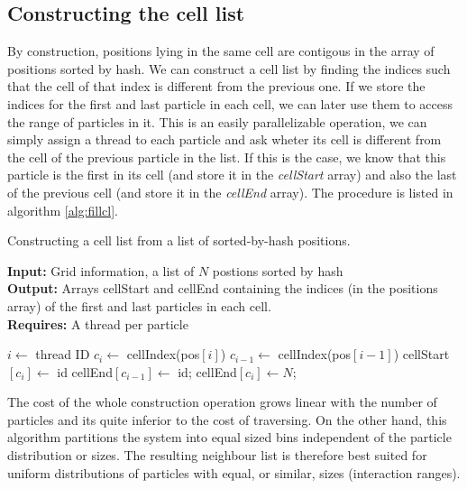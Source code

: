 \documentclass[ twoside,openright,titlepage,numbers=noenddot,%
headinclude,footinclude,cleardoublepage=empty,abstract=on,
BCOR=5mm,paper=a4,fontsize=11pt, dvipsnames
]{scrreprt}
\begin{document}
\subsection*{Constructing the cell list}
By construction, positions lying in the same cell are contigous in the array of positions sorted by hash. We can construct a cell list by finding the indices such that the cell of that index is different from the previous one. If we store the indices for the first and last particle in each cell, we can later use them to access the range of particles in it.
This is an easily parallelizable operation, we can simply assign a thread to each particle and ask wheter its cell is different from the cell of the previous particle in the list. If this is the case, we know that this particle is the first in its cell (and store it in the \emph{cellStart} array) and also the last of the previous cell (and store it in the \emph{cellEnd} array). The procedure is listed in algorithm \ref{alg:fillcl}.
\begin{algorithm}
  \caption{Constructing a cell list from a list of sorted-by-hash positions.} \label{alg:fillcl}
  \textbf{Input:} Grid information, a list of $N$ postions sorted by hash\\
  \textbf{Output:} Arrays cellStart and cellEnd containing the indices (in the positions array) of the first and last particles in each cell.\\
  \textbf{Requires:} A thread per particle
  \begin{algorithmic}[1]
    \State $i\gets$ thread ID 
    \State $c_i\gets$ cellIndex(pos$[i]$)
    \State $c_{i-1}\gets$ cellIndex(pos$[i-1]$)
    \EndIf
    \State cellStart$[c_i]\gets$ id
    \State cellEnd$[c_{i-1}]\gets$ id;
    \EndIf
    \EndIf
    \State cellEnd$[c_i]\gets N$;
    \EndIf
  \end{algorithmic}
\end{algorithm}

The cost of the whole construction operation grows linear with the number of particles and its quite inferior to the cost of traversing. On the other hand, this algorithm partitions the system into equal sized bins independent of the particle distribution or sizes. The resulting neighbour list is therefore best suited for uniform distributions of particles with equal, or similar, sizes (interaction ranges).
\end{document}
